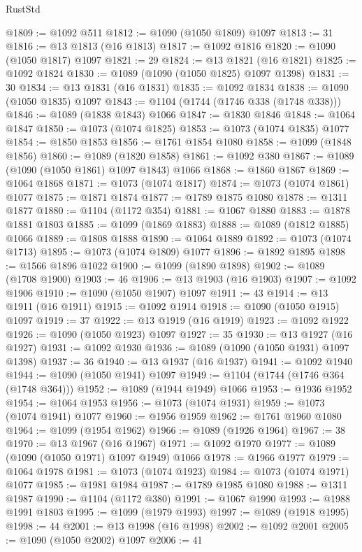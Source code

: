 \begin{lexlean}{RustStd}
\begin{coremodule}
@1809 := @1092 @511
@1812 := @1090 (@1050 @1809) @1097
@1813 := 31
@1816 := @13 @1813 (@16 @1813)
@1817 := @1092 @1816
@1820 := @1090 (@1050 @1817) @1097
@1821 := 29
@1824 := @13 @1821 (@16 @1821)
@1825 := @1092 @1824
@1830 := @1089 (@1090 (@1050 @1825) @1097 @1398)
@1831 := 30
@1834 := @13 @1831 (@16 @1831)
@1835 := @1092 @1834
@1838 := @1090 (@1050 @1835) @1097
@1843 := @1104 (@1744 (@1746 @338 (@1748 @338)))
@1846 := @1089 (@1838 @1843) @1066
@1847 := @1830 @1846
@1848 := @1064 @1847
@1850 := @1073 (@1074 @1825)
@1853 := @1073 (@1074 @1835) @1077
@1854 := @1850 @1853
@1856 := @1761 @1854 @1080
@1858 := @1099 (@1848 @1856)
@1860 := @1089 (@1820 @1858)
@1861 := @1092 @380
@1867 := @1089 (@1090 (@1050 @1861) @1097 @1843) @1066
@1868 := @1860 @1867
@1869 := @1064 @1868
@1871 := @1073 (@1074 @1817)
@1874 := @1073 (@1074 @1861) @1077
@1875 := @1871 @1874
@1877 := @1789 @1875 @1080
@1878 := @1311 @1877
@1880 := @1104 (@1172 @354)
@1881 := @1067 @1880
@1883 := @1878 @1881 @1803
@1885 := @1099 (@1869 @1883)
@1888 := @1089 (@1812 @1885) @1066
@1889 := @1808 @1888
@1890 := @1064 @1889
@1892 := @1073 (@1074 @1713)
@1895 := @1073 (@1074 @1809) @1077
@1896 := @1892 @1895
@1898 := @1566 @1896 @1022
@1900 := @1099 (@1890 @1898)
@1902 := @1089 (@1708 @1900)
@1903 := 46
@1906 := @13 @1903 (@16 @1903)
@1907 := @1092 @1906
@1910 := @1090 (@1050 @1907) @1097
@1911 := 43
@1914 := @13 @1911 (@16 @1911)
@1915 := @1092 @1914
@1918 := @1090 (@1050 @1915) @1097
@1919 := 37
@1922 := @13 @1919 (@16 @1919)
@1923 := @1092 @1922
@1926 := @1090 (@1050 @1923) @1097
@1927 := 35
@1930 := @13 @1927 (@16 @1927)
@1931 := @1092 @1930
@1936 := @1089 (@1090 (@1050 @1931) @1097 @1398)
@1937 := 36
@1940 := @13 @1937 (@16 @1937)
@1941 := @1092 @1940
@1944 := @1090 (@1050 @1941) @1097
@1949 := @1104 (@1744 (@1746 @364 (@1748 @364)))
@1952 := @1089 (@1944 @1949) @1066
@1953 := @1936 @1952
@1954 := @1064 @1953
@1956 := @1073 (@1074 @1931)
@1959 := @1073 (@1074 @1941) @1077
@1960 := @1956 @1959
@1962 := @1761 @1960 @1080
@1964 := @1099 (@1954 @1962)
@1966 := @1089 (@1926 @1964)
@1967 := 38
@1970 := @13 @1967 (@16 @1967)
@1971 := @1092 @1970
@1977 := @1089 (@1090 (@1050 @1971) @1097 @1949) @1066
@1978 := @1966 @1977
@1979 := @1064 @1978
@1981 := @1073 (@1074 @1923)
@1984 := @1073 (@1074 @1971) @1077
@1985 := @1981 @1984
@1987 := @1789 @1985 @1080
@1988 := @1311 @1987
@1990 := @1104 (@1172 @380)
@1991 := @1067 @1990
@1993 := @1988 @1991 @1803
@1995 := @1099 (@1979 @1993)
@1997 := @1089 (@1918 @1995)
@1998 := 44
@2001 := @13 @1998 (@16 @1998)
@2002 := @1092 @2001
@2005 := @1090 (@1050 @2002) @1097
@2006 := 41

\end{coremodule}
\end{lexlean}
